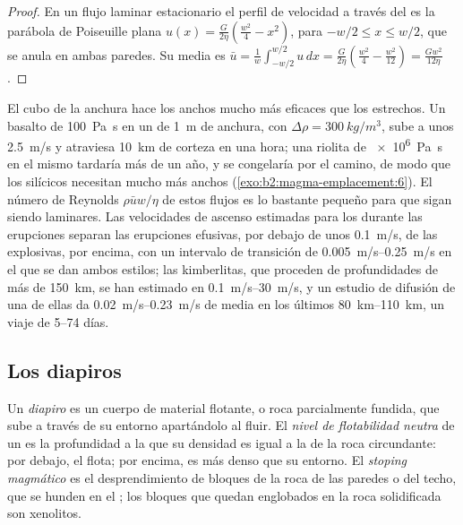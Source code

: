 \begin{proof}
En un flujo laminar estacionario el perfil de velocidad a través del  es la parábola
de Poiseuille plana $u(x) = \frac{G}{2\eta}\left(\frac{w^2}{4} - x^2\right)$, para
$-w/2 \le x \le w/2$, que se anula en ambas paredes. Su media es
$\bar u = \frac1w\int_{-w/2}^{w/2}u\,dx = \frac{G}{2\eta}\left(\frac{w^2}{4} -
\frac{w^2}{12}\right) = \frac{Gw^2}{12\eta}$.
\end{proof}

El cubo de la anchura hace los  anchos mucho más eficaces que los estrechos. Un
basalto de \qty{100}{Pa.s} en un  de \qty{1}{m} de anchura, con $\Delta\rho =
\qty{300}{kg/m^3}$, sube a unos \qty{2.5}{m/s} y atraviesa \qty{10}{km} de
corteza en una hora; una riolita de \qty{e6}{Pa.s} en el mismo  tardaría más
de un año, y se congelaría por el camino, de modo que los  silícicos necesitan 
mucho más anchos (\cref{exo:b2:magma-emplacement:6}). El número de Reynolds $\rho\bar u w/\eta$ de estos flujos
es lo bastante pequeño para que sigan siendo laminares. Las velocidades de ascenso estimadas para los 
durante las erupciones separan las erupciones efusivas, por debajo de unos \qty{0.1}{m/s}, de las
explosivas, por encima, con un intervalo de transición de \qtyrange{0.005}{0.25}{m/s}
en el que se dan ambos estilos; las kimberlitas, que proceden de
profundidades de más de \qty{150}{km}, se han estimado en \qtyrange{0.1}{30}{m/s}, y
un estudio de difusión de una de ellas da \qtyrange{0.02}{0.23}{m/s} de media en
los últimos \qtyrange{80}{110}{km}, un viaje de \numrange{5}{74} días.

\subsection{Los diapiros}

\begin{definition}\label{def:b2:magma-emplacement:ascent}
Un \emph{diapiro} es un cuerpo de material flotante,  o roca parcialmente
fundida, que sube a través de su entorno apartándolo al fluir. El
\emph{nivel de flotabilidad neutra} de un  es la
profundidad a la que su densidad es igual a la de la roca circundante: por debajo, el
 flota; por encima, es más denso que su entorno. El \emph{stoping
magmático} es el desprendimiento de bloques de la roca de las paredes o del
techo, que se hunden en el ; los bloques que quedan englobados en la roca
solidificada son xenolitos.
\end{definition}

